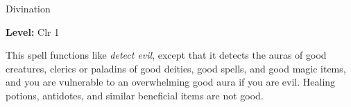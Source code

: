 
Divination

\textbf{Level:} Clr 1

This spell functions like \textit{detect evil}, except that it detects the auras 
of good creatures, clerics or paladins of good deities, good spells, and good magic 
items, and you are vulnerable to an overwhelming good aura if you are evil. Healing 
potions, antidotes, and similar beneficial items are not good.

